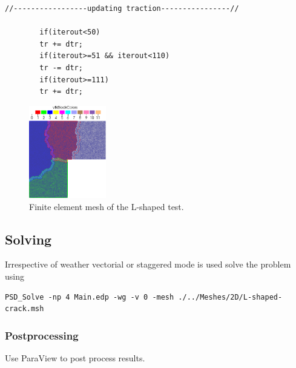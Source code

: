 {{\begin{itemize}
	\begin{lstlisting}[style=CppStyle]
		//-----------------updating traction----------------//
		
		if(iterout<50)
		tr += dtr;
		if(iterout>=51 && iterout<110) 
		tr -= dtr; 
		if(iterout>=111)
		tr += dtr; 
	\end{lstlisting}
	
	\begin{figure}[h!]
		\centering
		\includegraphics[width=0.3\textwidth]{./Images/fm-mesh.png}
		\caption{Finite element mesh of the L-shaped test. \label{L-shape-mesh}}
	\end{figure}
	
\end{itemize}


\subsection{Solving}

Irrespective of weather vectorial or staggered mode is used solve the problem using 

\begin{lstlisting}[style=BashInputStyle]
	PSD_Solve -np 4 Main.edp -wg -v 0 -mesh ./../Meshes/2D/L-shaped-crack.msh
\end{lstlisting}

\subsubsection{Postprocessing}

Use ParaView to post process results. 


}}
